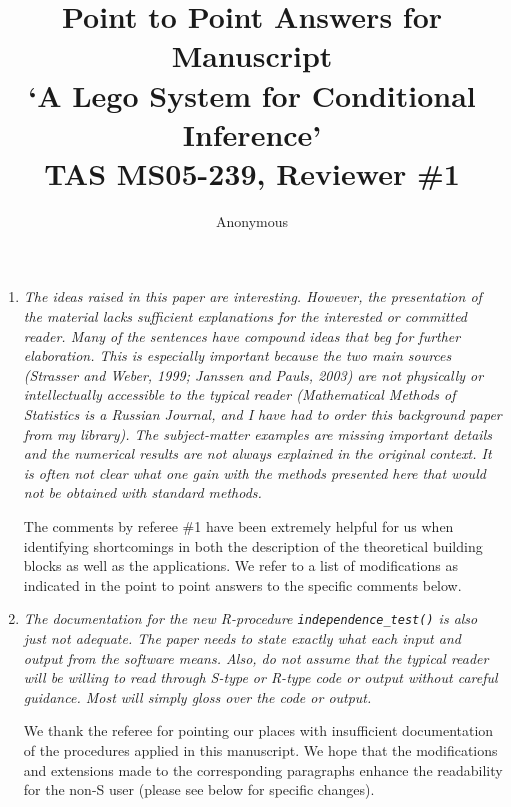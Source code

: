 \documentclass[11pt]{article}
\begin{document}
\title{Point to Point Answers for Manuscript \\
`A Lego System for Conditional Inference' \\
TAS MS05-239, Reviewer \#1}
\author{Anonymous}
\maketitle

\begin{enumerate}
\item \textsl{The ideas raised in this paper are interesting. However, the presentation of the 
              material lacks sufficient explanations for the interested or committed reader. 
              Many of the sentences have compound ideas that beg for further elaboration. 
              This is especially important because the two main sources (Strasser and Weber, 1999; 
              Janssen and Pauls, 2003) are not physically or intellectually accessible to the 
              typical reader (Mathematical Methods of Statistics is a Russian Journal, and I have 
              had to order this background paper from my library). The subject-matter examples are 
              missing important details and the numerical results are not always explained in the 
              original context. It is often not clear what one gain with the methods presented here 
              that would not be obtained with standard methods.}

The comments by referee \#1 have been extremely helpful for us when
identifying shortcomings in both the description of the theoretical
building blocks as well as the applications. We refer to a list of modifications
as indicated in the point to point answers to the specific comments below.

\item \textsl{The documentation for the new R-procedure \texttt{independence\_test()} is also just not 
              adequate. The paper needs to state exactly what each input and output from the 
              software means. Also, do not assume that the typical reader will be willing to 
              read through S-type or R-type code or output without careful guidance. Most will 
              simply gloss over the code or output.}

We thank the referee for pointing our places with insufficient documentation
of the procedures applied in this manuscript. We hope that the modifications
and extensions made to the corresponding paragraphs enhance the readability
for the non-\textsf{S} user (please see below for specific
changes).


\end{enumerate}
\end{document}
